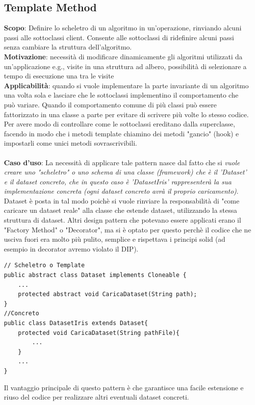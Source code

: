 \documentclass[a4paper, oneside]{book}
\begin{document}
\subsection*{Template Method}
\textbf{Scopo}: Definire lo scheletro di un algoritmo in un'operazione, rinviando alcuni passi alle sottoclassi
client. Consente alle sottoclassi di ridefinire alcuni passi senza cambiare la struttura dell'algoritmo.
\\
\textbf{Motivazione}: necessità di modificare dinamicamente gli algoritmi utilizzati da un'applicazione
e.g., visite in una struttura ad albero, possibilità di selezionare a tempo di esecuzione una tra le visite
\\
\textbf{Applicabilità}: quando si vuole implementare la parte invariante di un algoritmo una volta sola e
lasciare che le sottoclassi implementino il comportamento che può variare. Quando il comportamento comune di più classi può essere fattorizzato in una classe a parte per evitare di scrivere più volte lo stesso codice. Per avere modo di controllare come le sottoclassi ereditano dalla superclasse, facendo in modo che i metodi template chiamino dei metodi "gancio" (hook) e impostarli come unici metodi sovrascrivibili.
\\
\\
\textbf{Caso d'uso}: La necessità di applicare tale pattern nasce dal fatto che si \textit{vuole creare uno "scheletro" o uno schema di una classe (framework) che è il 'Dataset' e il dataset concreto, che in questo caso è 'DatasetIris' rappresenterà la sua implementazione concreta (ogni dataset concreto avrà il proprio caricamento).} \\ Dataset è posta in tal modo poichè si vuole rinviare la responsabilità di "come caricare un dataset reale" alla classe che estende dataset, utilizzando la stessa struttura di dataset.  Altri design pattern che potevano essere applicati erano il "Factory Method" o "Decorator", ma si è optato per questo perchè il codice che ne usciva fuori era molto più pulito, semplice e rispettava i principi solid (ad esempio in decorator avremo violato il DIP).\\
\begin{lstlisting}
// Scheletro o Template
public abstract class Dataset implements Cloneable {
    ...
    protected abstract void CaricaDataset(String path);
}
//Concreto
public class DatasetIris extends Dataset{
    protected void CaricaDataset(String pathFile){
        ...
    }
	...
}
\end{lstlisting}
Il vantaggio principale di questo pattern è che garantisce una facile estensione e riuso del codice per realizzare altri eventuali dataset concreti. 
\end{document}
